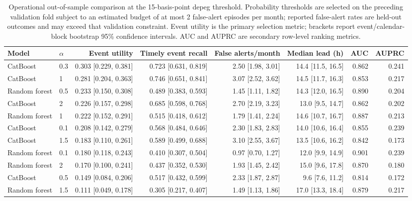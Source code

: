 \begin{table}[!htbp]
\caption{Operational out-of-sample comparison at the 15-basis-point depeg threshold. Probability thresholds are selected on the preceding validation fold subject to an estimated budget of at most 2 false-alert episodes per month; reported false-alert rates are held-out outcomes and may exceed that validation constraint. Event utility is the primary selection metric; brackets report event/calendar-block bootstrap 95\% confidence intervals. AUC and AUPRC are secondary row-level ranking metrics.}
\label{tab:cv_model_alpha_results}
\begin{tabular}{llrrrrrr}
\toprule
Model & $\alpha$ & Event utility & Timely event recall & False alerts/month & Median lead (h) & AUC & AUPRC \\
\midrule
CatBoost & 0.3 & 0.303 [0.229, 0.381] & 0.723 [0.631, 0.819] & 2.50 [1.98, 3.01] & 14.4 [11.5, 16.5] & 0.862 & 0.241 \\
CatBoost & 1 & 0.281 [0.204, 0.363] & 0.746 [0.651, 0.841] & 3.07 [2.52, 3.62] & 14.5 [11.7, 16.3] & 0.853 & 0.217 \\
Random forest & 0.5 & 0.233 [0.150, 0.308] & 0.489 [0.383, 0.593] & 1.45 [1.11, 1.82] & 14.3 [12.0, 16.5] & 0.890 & 0.204 \\
CatBoost & 2 & 0.226 [0.157, 0.298] & 0.685 [0.598, 0.768] & 2.70 [2.19, 3.23] & 13.0 [9.5, 14.7] & 0.862 & 0.202 \\
Random forest & 1 & 0.222 [0.152, 0.291] & 0.515 [0.418, 0.612] & 1.79 [1.41, 2.24] & 14.6 [10.7, 16.7] & 0.887 & 0.213 \\
CatBoost & 0.1 & 0.208 [0.142, 0.279] & 0.568 [0.484, 0.646] & 2.30 [1.83, 2.83] & 14.0 [10.6, 16.4] & 0.855 & 0.239 \\
CatBoost & 1.5 & 0.183 [0.110, 0.261] & 0.589 [0.499, 0.688] & 3.10 [2.55, 3.67] & 13.5 [10.6, 16.2] & 0.842 & 0.173 \\
Random forest & 0.1 & 0.180 [0.118, 0.243] & 0.410 [0.307, 0.504] & 0.97 [0.70, 1.27] & 12.0 [9.9, 14.9] & 0.901 & 0.239 \\
Random forest & 2 & 0.170 [0.100, 0.241] & 0.437 [0.352, 0.530] & 1.93 [1.45, 2.42] & 15.0 [9.6, 17.8] & 0.870 & 0.180 \\
CatBoost & 0.5 & 0.149 [0.084, 0.206] & 0.517 [0.432, 0.599] & 2.33 [1.87, 2.87] & 9.6 [7.6, 11.2] & 0.814 & 0.172 \\
Random forest & 1.5 & 0.111 [0.049, 0.178] & 0.305 [0.217, 0.407] & 1.49 [1.13, 1.86] & 17.0 [13.3, 18.4] & 0.879 & 0.217 \\

\end{tabular}
\end{table}
